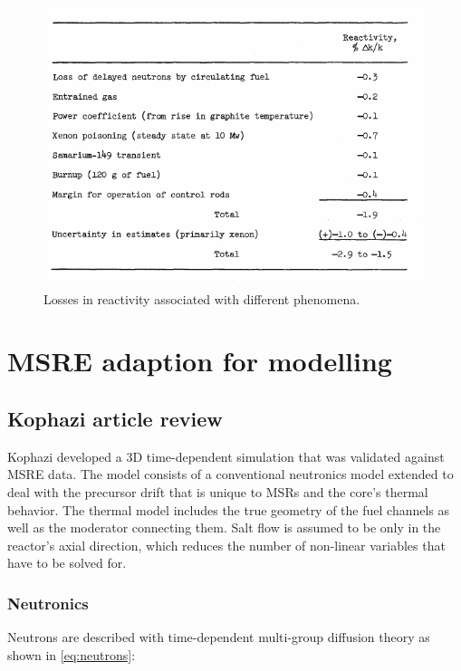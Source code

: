 \documentclass{article}
\begin{document}
\begin{figure}[htpb]
  \centering
  \includegraphics{reactivity-losses.png}
  \caption{Losses in reactivity associated with different
    phenomena. \cite{robertson_msre_1965}}
  \label{fig:reactivity_losses}
\end{figure}

\section{MSRE adaption for modelling}

\subsection{Kophazi article review}

Kophazi developed a 3D time-dependent simulation that was validated against MSRE
data. \cite{kophazi_development_????} The model consists of a conventional
neutronics model extended to deal with the precursor drift that is unique to
MSRs and the core's thermal behavior. The thermal model includes the true
geometry of the fuel channels as well as the moderator connecting them. Salt
flow is assumed to be only in the reactor's axial direction, which reduces the
number of non-linear variables that have to be solved for.

\subsubsection{Neutronics}

Neutrons are described with time-dependent multi-group diffusion theory as shown
in \cref{eq:neutrons}:
\end{document}
